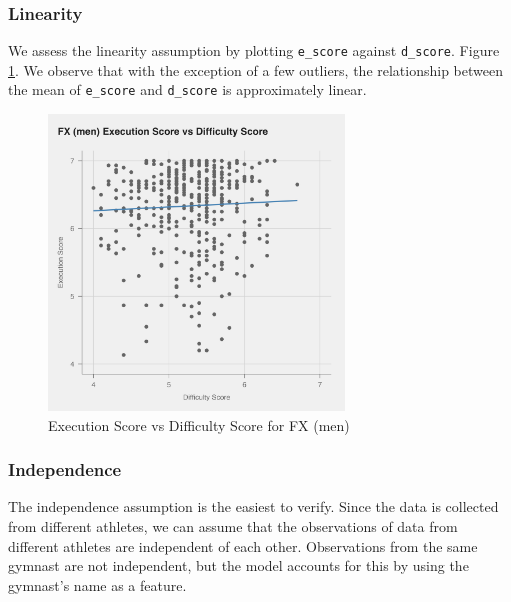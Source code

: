 \documentclass{article}
\begin{document}
\subsubsection{Linearity}
We assess the linearity assumption by plotting \texttt{e\_score} against \texttt{d\_score}. 
Figure \ref{fig:fx_m}. We observe that with the exception of a few outliers, the relationship
between the mean of \texttt{e\_score} and \texttt{d\_score} is approximately linear.
\begin{figure}[H]
   \centering 
   \includegraphics[width=0.7\textwidth]{../plots/fx_m_d_e.png}
   \caption{Execution Score vs Difficulty Score for FX (men)}
   \label{fig:fx_m}
\end{figure}

\subsubsection{Independence}
The independence assumption is the easiest to verify. Since the data is collected 
from different athletes, we can assume that the observations of data from different athletes are independent of each other. 
Observations from the same gymnast are not independent, but the model accounts for this by using the gymnast's name as a feature.
\end{document}
